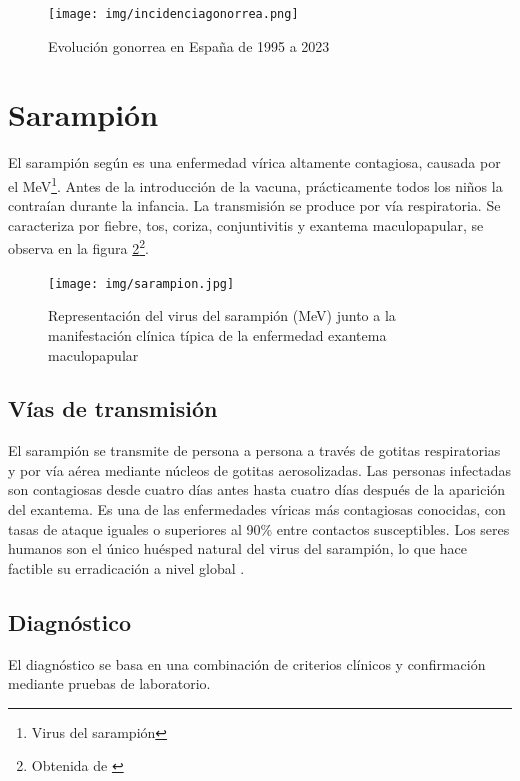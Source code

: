 \begin{figure}[H]
    \centering
    \texttt{[image: img/incidenciagonorrea.png]}
    \caption{Evolución gonorrea en España de 1995 a 2023}
    \label{fig:evolución gonorrea}
    \vspace{0.5cm} %
\end{figure}


\section{Sarampión}
El sarampión según \cite{workowski2021sexually}es una enfermedad vírica altamente contagiosa, causada por el MeV\footnote{Virus del sarampión}. Antes de la introducción de la vacuna, prácticamente todos los niños la contraían durante la infancia. La transmisión se produce por vía respiratoria. Se caracteriza por fiebre, tos, coriza, conjuntivitis y exantema maculopapular, se observa en la figura \ref{fig:sarampión}\footnote{Obtenida de \cite{tododiagnostico2020sarampion}}.

\begin{figure}[H]
        \centering
        \texttt{[image: img/sarampion.jpg]}
        \caption{Representación del virus del sarampión (MeV) junto a la manifestación clínica típica de la enfermedad exantema maculopapular}
        \label{fig:sarampión}
        \vspace{0.5cm} %
\end{figure}

\subsection{Vías de transmisión}
El sarampión se transmite de persona a persona a través de gotitas respiratorias y por vía aérea mediante núcleos de gotitas aerosolizadas. Las personas infectadas son contagiosas desde cuatro días antes hasta cuatro días después de la aparición del exantema. Es una de las enfermedades víricas más contagiosas conocidas, con tasas de ataque iguales o superiores al 90\% entre contactos susceptibles. Los seres humanos son el único huésped natural del virus del sarampión, lo que hace factible su erradicación a nivel global \cite{moss2017measles}.

\subsection{Diagnóstico}
El diagnóstico se basa \cite{baeten2012antiretroviral} en una combinación de criterios clínicos y confirmación mediante pruebas de laboratorio.

